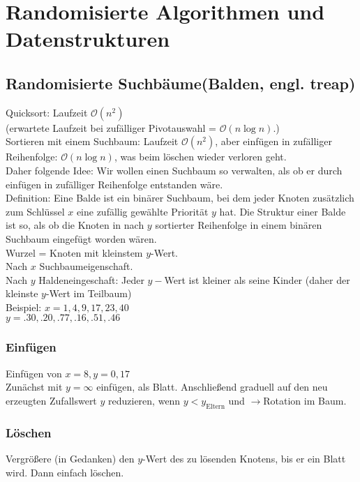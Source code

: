 \section{Randomisierte Algorithmen und Datenstrukturen}
\subsection{Randomisierte Suchbäume(Balden, engl. treap)}
Quicksort: Laufzeit $\mathcal{O}(n^2)$\\
(erwartete Laufzeit bei zufälliger Pivotauswahl = $\mathcal{O}(n \log n)$.)\\
Sortieren mit einem Suchbaum: Laufzeit $\mathcal{O}(n^2)$, aber einfügen in zufälliger Reihenfolge: $\mathcal{O}(n \log n)$, was beim löschen wieder verloren geht. \\
Daher folgende Idee: Wir wollen einen Suchbaum so verwalten, als ob er durch einfügen in zufälliger Reihenfolge entstanden wäre.\\
Definition: Eine Balde ist ein binärer Suchbaum, bei dem jeder Knoten zusätzlich zum Schlüssel $x$ eine zufällig gewählte Priorität $y$ hat. Die Struktur einer Balde ist so, als ob die Knoten in nach $y$ sortierter Reihenfolge in einem binären Suchbaum eingefügt worden wären.\\
Wurzel = Knoten mit kleinstem $y$-Wert.\\
Nach $x$ Suchbaumeigenschaft.\\
Nach $y$ Haldeneingeschaft: Jeder $y-$Wert ist kleiner als seine Kinder (daher der kleinste $y$-Wert im Teilbaum)\\
Beispiel: $ x = 1, 4,9,17,23,40$\\
$y = .30,.20,.77,.16,.51,.46$\\
\subsubsection{Einfügen}
Einfügen von $x = 8, y = 0,17$\\
Zunächst mit $y = \infty$ einfügen, als Blatt. Anschließend graduell auf den neu erzeugten Zufallswert $y$ reduzieren, wenn $y < y_{\text{Eltern}}$ und $\rightarrow$Rotation im Baum.
\subsubsection{Löschen}
Vergrößere (in Gedanken) den $y$-Wert des zu lösenden Knotens, bis er ein Blatt wird. Dann einfach löschen.\\
